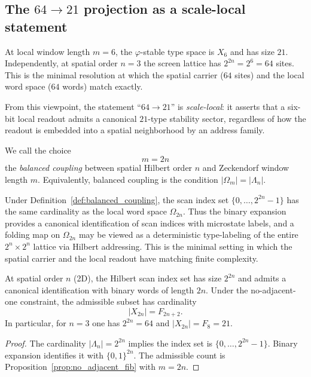 \subsection{The \texorpdfstring{$64\to 21$}{64->21} projection as a scale-local statement}
At local window length $m=6$, the $\varphi$-stable type space is $X_6$ and has size $21$.
Independently, at spatial order $n=3$ the screen lattice has $2^{2n}=2^6=64$ sites.
This is the minimal resolution at which the spatial carrier ($64$ sites) and the local word space ($64$ words) match exactly.

From this viewpoint, the statement ``$64\to 21$'' is \emph{scale-local}:
it asserts that a six-bit local readout admits a canonical $21$-type stability sector, regardless of how the readout is embedded into a spatial neighborhood by an address family.

\begin{definition}
\label{def:balanced_coupling}
We call the choice
\[
m=2n
\]
the \emph{balanced coupling} between spatial Hilbert order $n$ and Zeckendorf window length $m$.
Equivalently, balanced coupling is the condition $|\Omega_m|=|\Lambda_n|$.
\end{definition}

\begin{remark}
Under Definition~\ref{def:balanced_coupling}, the scan index set $\{0,\dots,2^{2n}-1\}$ has the same cardinality as the local word space $\Omega_{2n}$.
Thus the binary expansion provides a canonical identification of scan indices with microstate labels, and a folding map on $\Omega_{2n}$ may be viewed as a deterministic type-labeling of the entire $2^n\times 2^n$ lattice via Hilbert addressing.
This is the minimal setting in which the spatial carrier and the local readout have matching finite complexity.
\end{remark}

\begin{proposition}
\label{prop:hilbert_index_fib_count}
At spatial order $n$ (2D), the Hilbert scan index set has size $2^{2n}$ and admits a canonical identification with binary words of length $2n$.
Under the no-adjacent-one constraint, the admissible subset has cardinality
\[
|X_{2n}|=F_{2n+2}.
\]
In particular, for $n=3$ one has $2^{2n}=64$ and $|X_{2n}|=F_8=21$.
\end{proposition}

\begin{proof}
The cardinality $|\Lambda_n|=2^{2n}$ implies the index set is $\{0,\dots,2^{2n}-1\}$.
Binary expansion identifies it with $\{0,1\}^{2n}$.
The admissible count is Proposition~\ref{prop:no_adjacent_fib} with $m=2n$.
\end{proof}

